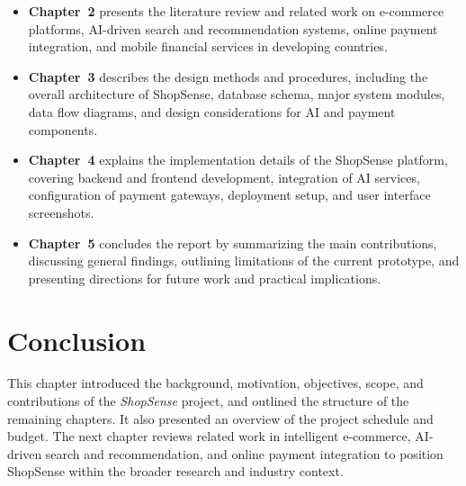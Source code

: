 \begin{itemize}
  \item \textbf{Chapter~2} presents the literature review and related work on e-commerce platforms, AI-driven search and recommendation systems, online payment integration, and mobile financial services in developing countries.
  \item \textbf{Chapter~3} describes the design methods and procedures, including the overall architecture of ShopSense, database schema, major system modules, data flow diagrams, and design considerations for AI and payment components.
  \item \textbf{Chapter~4} explains the implementation details of the ShopSense platform, covering backend and frontend development, integration of AI services, configuration of payment gateways, deployment setup, and user interface screenshots.
  \item \textbf{Chapter~5} concludes the report by summarizing the main contributions, discussing general findings, outlining limitations of the current prototype, and presenting directions for future work and practical implications.
\end{itemize}

\section{Conclusion}
This chapter introduced the background, motivation, objectives, scope, and contributions of the \textit{ShopSense} project, and outlined the structure of the remaining chapters. It also presented an overview of the project schedule and budget. The next chapter reviews related work in intelligent e-commerce, AI-driven search and recommendation, and online payment integration to position ShopSense within the broader research and industry context.